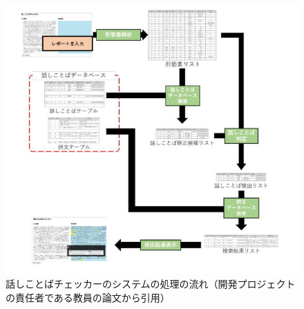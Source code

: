 \documentclass[12pt, a4paper]{jreport}
\begin{document}
\begin{figure}[H]
\centering
\includegraphics[width=1\linewidth]{image/cqcNagare.png}
\caption{話しことばチェッカーのシステムの処理の流れ（開発プロジェクトの責任者である教員の論文\cite{Yamashita}から引用）}
\label{fig:enter-label}
\end{figure}
\end{document}
